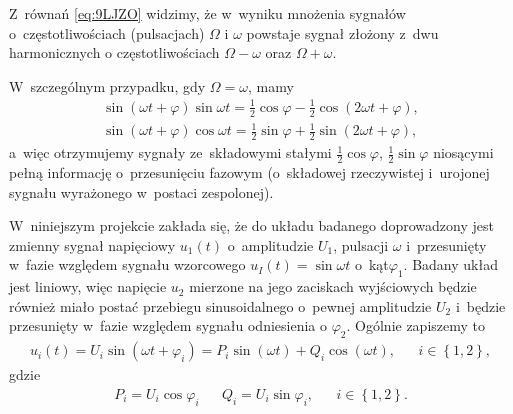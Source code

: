 \documentclass[paper=a4,DIV=12]{tfa}
\begin{document}
Z~równań \eqref{eq:9LJZO} widzimy, że w~wyniku mnożenia sygnałów
o~częstotliwościach (pulsacjach) $\Omega$ i $\omega$ powstaje sygnał
złożony z~dwu harmonicznych o częstotliwościach $\Omega - \omega$ oraz $\Omega
+ \omega$.

W~szczególnym przypadku, gdy $\Omega = \omega$, mamy
\begin{subequations}
  \label{eq:EE55O}
  \begin{align}
    &
    \sin \left(\omega t + \varphi\right) \sin\omega t
    =
    \frac{1}{2} \cos{\varphi} - \frac{1}{2} \cos{(2 \omega t + \varphi)},
    &
    \label{eq:U3M0L}
    \\
    &
    \sin \left(\omega t + \varphi\right) \cos \omega t
    =
    \frac{1}{2} \sin{\varphi} + \frac{1}{2} \sin{(2 \omega t + \varphi)},
    &
    \label{eq:2ENFD}
  \end{align}
\end{subequations}
a~więc otrzymujemy sygnały ze~składowymi stałymi $\frac{1}{2}\cos\varphi$,
$\frac{1}{2}\sin\varphi$ niosącymi pełną informację o~przesunięciu fazowym
(o~składowej rzeczywistej i~urojonej sygnału wyrażonego w~postaci zespolonej).

W~niniejszym projekcie zakłada się, że do układu badanego doprowadzony jest
zmienny sygnał napięciowy $u_1(t)$ o~amplitudzie $U_1$, pulsacji $\omega$
i~przesunięty w~fazie względem sygnału wzorcowego $u_I(t) = \sin{\omega t}$
o~kąt$\varphi_1$. Badany układ jest liniowy, więc napięcie $u_2$ mierzone na
jego zaciskach wyjściowych będzie również miało postać przebiegu sinusoidalnego
o~pewnej amplitudzie $U_2$ i~będzie przesunięty w~fazie względem sygnału
odniesienia o $\varphi_2$.  Ogólnie zapiszemy to
\begin{align}
  & u_i(t) = U_i \sin{(\omega t + \varphi_i)}
         = P_i \sin{(\omega t)} + Q_i \cos{(\omega t)},
  &
  & i \in \left\lbrace 1, 2 \right\rbrace, &
  \label{eq:MG9JQ}
\end{align}
gdzie
\begin{align}
  & P_i = U_i \cos{\varphi_i} &
  & Q_i = U_i \sin{\varphi_i}, &
  & i \in \left\lbrace 1, 2 \right\rbrace. &
  \label{eq:9UTG8}
\end{align}
\end{document}
